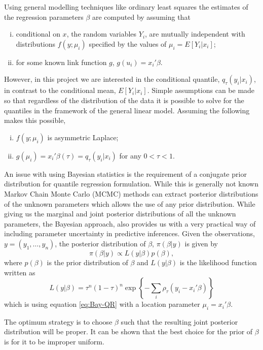 \documentclass[12pt,a4paper]{report}
\begin{document}
Using general modelling techniques like ordinary least squares the estimates of the regression parameters $\beta$ are computed by assuming that
\begin{enumerate}[(i)]
    \item conditional on $x$, the random variables $Y_{i}$, are mutually independent with distributions $f(y;\mu_{i})$ specified by the values of $\mu_{i}=E[Y_{i}|x_{i}]$;
    \item for some known link function $g$, $g(u_{i})=x_{i}'\beta$.
\end{enumerate}

However, in this project we are interested in the conditional quantile, $q_{\tau}(y_{i}|x_{i})$, in contrast to the conditional mean, $E[Y_{i}|x_{i}]$. Simple assumptions can be made so that regardless of the distribution of the data it is possible to solve for the quantiles in the framework of the general linear model. Assuming the following makes this possible,
\begin{enumerate}[(i)]
    \item $f(y; \mu_{i})$ is asymmetric Laplace;
    \item $g(\mu_{i})=x_{i}'\beta(\tau)=q_{\tau}(y_{i}|x_{i})$ for any $0<\tau<1$.
\end{enumerate}

An issue with using Bayesian statistics is the requirement of a conjugate prior distribution for quantile regression formulation. While this is generally not known Markov Chain Monte Carlo (MCMC) methods can extract posterior distributions of the unknown parameters which allows the use of any prior distribution. While giving us the marginal and joint posterior distributions of all the unknown parameters, the Bayesian approach, also provides us with a very practical way of including parameter uncertainty in predictive inferences.
Given the observations, $y=(y_{1},\ldots,y_{n})$, the posterior distribution of $\beta$, $\pi(\beta|y)$ is given by
$$\pi(\beta|y) \propto L(y| \beta) p( \beta),$$
where $p(\beta)$ is the prior distribution of $\beta$ and $L(y|\beta)$ is the likelihood function written as
\begin{equation}
\label{eq:Bay-Likelihood}
    L(y|\beta)=\tau^{n}(1-\tau)^{n}\exp\left\{-\sum_{i}\rho_{\tau}(y_{i}-x_{i}'\beta)\right\}
\end{equation}
which is using equation \ref{eq:Bay-QR} with a location parameter $\mu_{i}=x_{i}'\beta$.
\vspace{2mm}

The optimum strategy is to choose $\beta$ such that the resulting joint posterior distribution will be proper. It can be shown that the best choice for the prior of $\beta$ is for it to be improper uniform.
\end{document}
